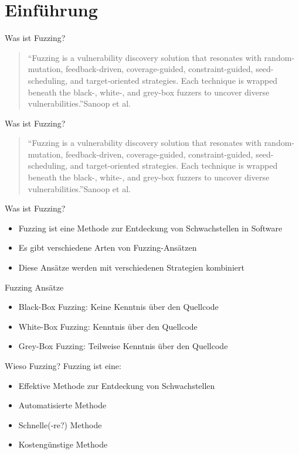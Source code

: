 
\section{Einführung}\label{sec:einfuhrung}
\begin{frame}{Was ist Fuzzing?}
    \blockquote{\enquote{Fuzzing is a vulnerability discovery solution that resonates with random-mutation, feedback-driven,
        coverage-guided, constraint-guided, seed-scheduling, and target-oriented strategies.
        Each technique is wrapped beneath the black-, white-, and grey-box fuzzers to uncover diverse vulnerabilities.}Sanoop et al.~\cite{fuzzing_methods}}
\end{frame}
\begin{frame}{Was ist Fuzzing?}
    \blockquote{\enquote{Fuzzing is a \alert{vulnerability discovery solution} that resonates with random-mutation, feedback-driven,
        coverage-guided, constraint-guided, seed-scheduling, and target-oriented \alert{strategies}.
        Each \alert{technique} is wrapped beneath the black-, white-, and grey-box fuzzers to uncover diverse vulnerabilities.}Sanoop et al.~\cite{fuzzing_methods}}
\end{frame}
\begin{frame}{Was ist Fuzzing?}
    \begin{itemize}
        \item Fuzzing ist eine Methode zur Entdeckung von Schwachstellen in Software
        \item Es gibt verschiedene Arten von Fuzzing-Ansätzen
        \item Diese Ansätze werden mit verschiedenen Strategien kombiniert
    \end{itemize}
\end{frame}
\begin{frame}{Fuzzing Ansätze}
    \begin{itemize}
        \item Black-Box Fuzzing: Keine Kenntnis über den Quellcode
        \item White-Box Fuzzing: Kenntnis über den Quellcode
        \item Grey-Box Fuzzing: Teilweise Kenntnis über den Quellcode
    \end{itemize}
\end{frame}
\begin{frame}{Wieso Fuzzing?}
    Fuzzing ist eine:
    \begin{itemize}
        \item Effektive Methode zur Entdeckung von Schwachstellen
        \item Automatisierte Methode
        \item Schnelle(-re?) Methode
        \item Kostengünstige Methode
    \end{itemize}
\end{frame}
